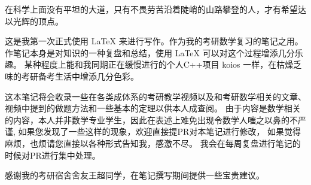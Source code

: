 \frontmatter
在科学上面没有平坦的大道，只有不畏劳苦沿着陡峭的山路攀登的人，才有希望达以光辉的顶点。

这是我第一次正式使用 \LaTeX{} 来进行写作。作为我的考研数学复习的笔记之用。
作笔记本身是对知识的一种复盘和总结，使用 \LaTeX{} 可以对这个过程增添几分乐趣。
某种程度上能和我同期正在缓慢进行的个人C++项目 koios 一样，在枯燥乏味的考研备考生活中增添几分色彩。

这本笔记将会收录一些在各类成体系的考研教学视频以及和考研数学相关的文章、
视频中提到的做题方法和一些基本的定理以供本人成查阅。
由于内容是数学相关的内容，本人并非数学专业学生，因此在表述上难免出现令数学人嗤之以鼻的不严谨,
如果您发现了一些这样的现象，欢迎直接提PR对本笔记进行修改，
如果觉得麻烦，也烦请您直接以各种形式告知我，感激不尽。
我会在每周复盘进行笔记的时候对PR进行集中处理。

感谢我的考研宿舍舍友王超同学，在笔记撰写期间提供一些宝贵建议。
